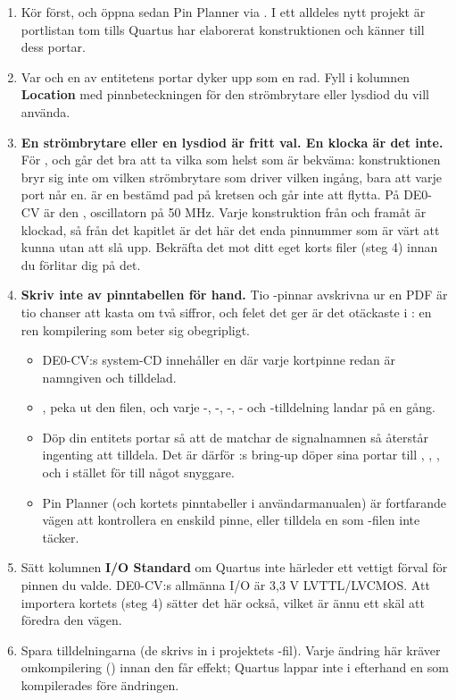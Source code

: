\begin{enumerate}
  \item Kör  först, och öppna sedan Pin
    Planner via . I ett alldeles nytt projekt är portlistan tom
    tills Quartus har elaborerat konstruktionen och känner till dess portar.
  \item Var och en av entitetens portar dyker upp som en rad. Fyll i kolumnen \textbf{Location} med
    pinnbeteckningen för den strömbrytare eller lysdiod du vill använda.
  \item \textbf{En strömbrytare eller en lysdiod är fritt val. En klocka är det inte.} För
    ,  och  går det bra att ta vilka som helst som är bekväma:
    konstruktionen bryr sig inte om vilken strömbrytare som driver vilken ingång, bara att varje
    port når en.  är en bestämd pad på kretsen och går inte att flytta. På DE0-CV är
    den \textbf{}, oscillatorn på 50 MHz. Varje konstruktion från  och
    framåt är klockad, så från det kapitlet är det här det enda pinnummer som är värt att kunna utan
    att slå upp. Bekräfta det mot ditt eget korts filer (steg 4) innan du förlitar dig på det.
  \item \textbf{Skriv inte av pinntabellen för hand.} Tio -pinnar avskrivna ur en PDF är
    tio chanser att kasta om två siffror, och felet det ger är det otäckaste i
    : en ren kompilering som beter sig obegripligt.
    \begin{itemize}
      \item DE0-CV:s system-CD innehåller en  där varje kortpinne redan är namngiven
        och tilldelad.
      \item {}, peka ut den filen, och varje
        -, -, -, - och
        -tilldelning landar på en gång.
      \item Döp din entitets portar så att de matchar de signalnamnen så återstår ingenting att
        tilldela. Det är därför :s bring-up döper sina portar till ,
        , ,  och  i stället för till något snyggare.
      \item Pin Planner (och kortets pinntabeller i användarmanualen) är fortfarande vägen att
        kontrollera en enskild pinne, eller tilldela en som -filen inte täcker.
    \end{itemize}
  \item Sätt kolumnen \textbf{I/O Standard} om Quartus inte härleder ett vettigt förval för pinnen du
    valde. DE0-CV:s allmänna I/O är 3,3 V LVTTL/LVCMOS. Att importera kortets  (steg 4)
    sätter det här också, vilket är ännu ett skäl att föredra den vägen.
  \item Spara tilldelningarna (de skrivs in i projektets -fil). Varje ändring här kräver
    omkompilering () innan den får effekt; Quartus lappar inte i
    efterhand en  som kompilerades före ändringen.
\end{enumerate}

